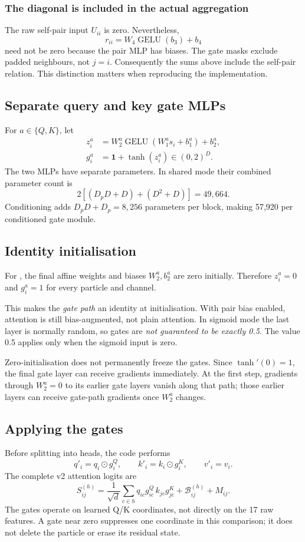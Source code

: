 \documentclass[11pt,a4paper]{article}
\newcommand{\GELU}{\operatorname{GELU}}
\newcommand{\Had}{\odot}
\newcommand{\code}[1]{\texttt{\small\detokenize{#1}}}
\numberwithin{equation}{section}
\begin{document}
\subsubsection{The diagonal is included in the actual aggregation}
The raw self-pair input $U_{ii}$ is zero. Nevertheless,
\[
 r_{ii}=W_4\GELU(b_3)+b_4
\]
need not be zero because the pair MLP has biases.
The gate masks exclude padded neighbours, not $j=i$.
Consequently the sums above include the self-pair relation.
This distinction matters when reproducing the implementation.

\subsection{Separate query and key gate MLPs}
For $a\in\{Q,K\}$, let
\begin{align}
 z_i^a&=W_2^a\GELU(W_1^a s_i+b_1^a)+b_2^a,\\
 g_i^a&=\mathbf1+\tanh(z_i^a)\in(0,2)^D.\label{eq:gate}
\end{align}
The two MLPs have separate parameters. In shared mode their combined
parameter count is
\[
 2[(D_pD+D)+(D^2+D)]=49{,}664.
\]
Conditioning adds $D_pD+D_p=8{,}256$ parameters per block, making
57,920 per conditioned gate module.

\subsection{Identity initialisation}
For \code{gate_mode="identity"}, the final affine weights and biases
$W_2^a,b_2^a$ are zero initially. Therefore $z_i^a=0$ and $g_i^a=1$
for every particle and channel.

This makes the \emph{gate path} an identity at initialisation.
With pair bias enabled, attention is still bias-augmented, not plain
attention. In sigmoid mode the last layer is normally random, so gates
are \emph{not guaranteed to be exactly 0.5}. The value 0.5 applies only
when the sigmoid input is zero.

Zero-initialisation does not permanently freeze the gates.
Since $\tanh'(0)=1$, the final gate layer can receive gradients immediately.
At the first step, gradients through $W_2^a=0$ to its earlier gate layers
vanish along that path; those earlier layers can receive gate-path gradients
once $W_2^a$ changes.

\subsection{Applying the gates}
Before splitting into heads, the code performs
\begin{equation}
 q'_i=q_i\Had g_i^Q,\qquad k'_i=k_i\Had g_i^K,\qquad v'_i=v_i.
\end{equation}
The complete v2 attention logits are
\begin{equation}\label{eq:gds}
 S^{(h)}_{ij}=
 \frac1{\sqrt d}\sum_{c\in h}
 q_{ic}g^Q_{ic}\,k_{jc}g^K_{jc}
 +\mathcal B^{(h)}_{ij}+M_{ij}.
\end{equation}
The gates operate on learned Q/K coordinates, not directly on the 17 raw
features. A gate near zero suppresses one coordinate in this comparison;
it does not delete the particle or erase its residual state.
\end{document}
